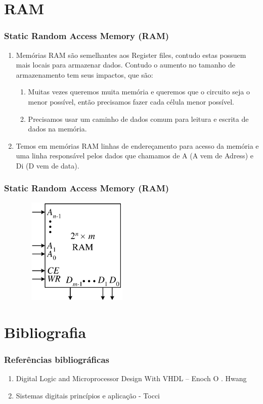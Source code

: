 \documentclass{beamer}
\begin{document}
\section{RAM}
\begin{frame}
 \frametitle{Static Random Access Memory (RAM)}
 \begin{enumerate}
  \item Memórias RAM são semelhantes aos Register files, contudo estas possuem mais locais para armazenar dados. 
	Contudo o aumento no tamanho de armazenamento tem seus impactos, que são: \pause
    \begin{enumerate}
      \item Muitas vezes queremos muita memória e queremos que o circuito seja o menor possível, então precisamos fazer cada célula menor possível.\pause
      \item Precisamos usar um caminho de dados comum para leitura e escrita de dados na memória. \pause
    \end{enumerate}
  \item Temos em memórias RAM linhas de endereçamento para acesso da memória e uma linha responsável pelos dados que chamamos de A (A vem de Adress) 
	e Di (D vem de data).
 \end{enumerate}
\end{frame}

\begin{frame}
 \frametitle{Static Random Access Memory (RAM)}
  \includegraphics[height=2in, width=3in]{RAM.png}
\end{frame}

\section{Bibliografia}
\begin{frame}
 \frametitle{Referências bibliográficas}
 \begin{enumerate}
  \item Digital Logic and Microprocessor Design With VHDL – Enoch O . Hwang
  \item Sistemas digitais princípios e aplicação - Tocci
 \end{enumerate}
\end{frame}
\end{document}
